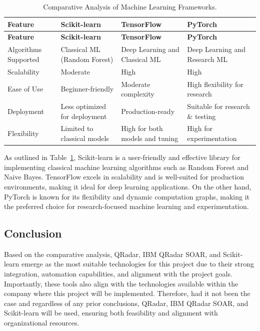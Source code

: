 \begin{longtable}{@{}p{3cm}p{3cm}p{3cm}p{3cm}@{}}
    \caption{Comparative Analysis of Machine Learning Frameworks.}
    \label{tab:ml_ca} \\
    \toprule
    \textbf{Feature} & \textbf{Scikit-learn} & \textbf{TensorFlow} & \textbf{PyTorch} \\
    \midrule
    \endfirsthead
    \toprule
    \textbf{Feature} & \textbf{Scikit-learn} & \textbf{TensorFlow} & \textbf{PyTorch} \\
    \midrule
    \endhead
    \bottomrule
    \endfoot
    \bottomrule
    \endlastfoot
    Algorithms Supported & Classical ML (Random Forest) & Deep Learning and Classical ML & Deep Learning and Research ML \\
    Scalability & Moderate & High & High \\
    Ease of Use & Beginner-friendly & Moderate complexity & High flexibility for research \\
    Deployment & Less optimized for deployment & Production-ready & Suitable for research \& testing \\
    Flexibility & Limited to classical models & High for both models and tuning & High for experimentation \\
\end{longtable}

As outlined in Table~\ref{tab:ml_ca}, Scikit-learn is a user-friendly and effective library for implementing classical machine learning algorithms such as Random Forest and Naive Bayes. 
TensorFlow excels in scalability and is well-suited for production environments, making it ideal for deep learning applications. 
On the other hand, PyTorch is known for its flexibility and dynamic computation graphs, making it the preferred choice for research-focused machine learning and experimentation.

\subsection{Conclusion}
Based on the comparative analysis, QRadar, IBM QRadar SOAR, and Scikit-learn emerge as the most suitable technologies for this project due to their strong integration, automation capabilities, and alignment with the project goals. 
Importantly, these tools also align with the technologies available within the company where this project will be implemented. 
Therefore, had it not been the case and regardless of any prior conclusions, QRadar, IBM QRadar SOAR, and Scikit-learn will be used, ensuring both feasibility and alignment with organizational resources.